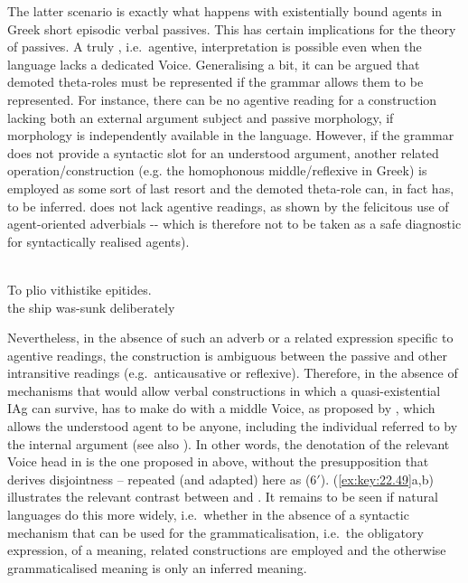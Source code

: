 \documentclass[output=paper]{langsci/langscibook}
\begin{document}
The latter scenario is exactly what happens with existentially bound agents in
Greek short episodic verbal passives. This has certain implications for the
theory of passives. A truly , i.e.\ agentive, interpretation is possible
even when the language lacks a dedicated  Voice. Generalising a bit, it
can be argued that demoted theta-roles must be represented if the grammar
allows them to be represented. For instance, there can be no agentive reading
for a construction lacking both an external argument subject and passive
morphology, if  morphology is independently available in the
language. However, if the grammar does not provide a syntactic slot for an
understood argument, another related operation/construction (e.g.  the
homophonous middle/reflexive in Greek) is employed as some sort of last resort
and the demoted theta-role can, in fact has, to be inferred.  does
not lack agentive readings, as shown by the felicitous use of agent-oriented
adverbials  -{}- which is therefore not to be taken as a safe
diagnostic for syntactically realised agents).

\ea%
    \label{ex:key:22.48}\\
    \gll    To     plio  vithistike   epitides.\\
            the ship   was-sunk   deliberately\\
\z

Nevertheless, in the absence of such an adverb or a related expression specific
to agentive readings, the  construction is ambiguous between the passive
and other intransitive readings (e.g.\ anticausative or reflexive). Therefore,
in the absence of mechanisms that would allow verbal constructions in which a
quasi-existential \gls{IAg} can survive,  has to make do with a middle Voice, as proposed by
\citet{SpathasEtAl2015}, which allows the understood agent to be anyone,
including the individual referred to by the internal argument (see also
\citealt{AlexiadouDoron2012}). In other words, the denotation of the relevant
Voice head in  is the one proposed in  above, without the
presupposition that derives disjointness – repeated (and adapted) here as (6$'$).
(\ref{ex:key:22.49}a,b) illustrates the relevant contrast between 
and . It remains to be seen if natural languages do this more
widely, i.e.\ whether in the absence of a syntactic mechanism that can be used
for the grammaticalisation, i.e.\ the obligatory
expression, of a meaning, related constructions are employed and the otherwise
grammaticalised meaning is only an inferred meaning.
\end{document}
